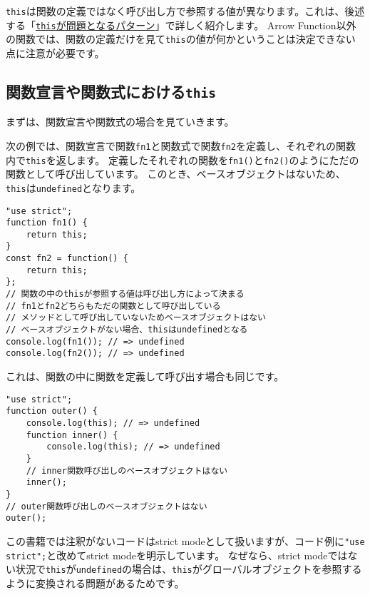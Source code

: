 \texttt{this}は関数の定義ではなく呼び出し方で参照する値が異なります。これは、後述する「\hyperlink{this-problem}{\texttt{this}が問題となるパターン}」で詳しく紹介します。
Arrow
Function以外の関数では、関数の定義だけを見て\texttt{this}の値が何かということは決定できない点に注意が必要です。

\hypertarget{function-declaration-expression-this}{%
\subsection{\texorpdfstring{関数宣言や関数式における\texttt{this}}{関数宣言や関数式におけるthis}}\label{function-declaration-expression-this}}

まずは、関数宣言や関数式の場合を見ていきます。

次の例では、関数宣言で関数\texttt{fn1}と関数式で関数\texttt{fn2}を定義し、それぞれの関数内で\texttt{this}を返します。
定義したそれぞれの関数を\texttt{fn1()}と\texttt{fn2()}のようにただの関数として呼び出しています。
このとき、ベースオブジェクトはないため、\texttt{this}は\texttt{undefined}となります。

\begin{lstlisting}
"use strict";
function fn1() {
    return this;
}
const fn2 = function() {
    return this;
};
// 関数の中のthisが参照する値は呼び出し方によって決まる
// fn1とfn2どちらもただの関数として呼び出している
// メソッドとして呼び出していないためベースオブジェクトはない
// ベースオブジェクトがない場合、thisはundefinedとなる
console.log(fn1()); // => undefined
console.log(fn2()); // => undefined
\end{lstlisting}

これは、関数の中に関数を定義して呼び出す場合も同じです。

\begin{lstlisting}
"use strict";
function outer() {
    console.log(this); // => undefined
    function inner() {
        console.log(this); // => undefined
    }
    // inner関数呼び出しのベースオブジェクトはない
    inner();
}
// outer関数呼び出しのベースオブジェクトはない
outer();
\end{lstlisting}

この書籍では注釈がないコードはstrict
modeとして扱いますが、コード例に\texttt{"use strict";}と改めてstrict
modeを明示しています。 なぜなら、strict
modeではない状況で\texttt{this}が\texttt{undefined}の場合は、\texttt{this}がグローバルオブジェクトを参照するように変換される問題があるためです。

